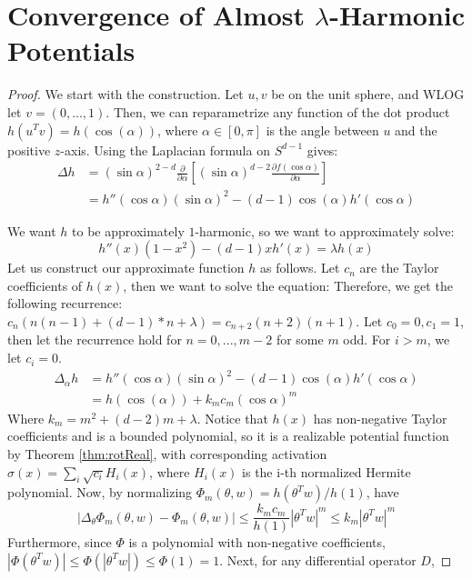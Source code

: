 

\section{Convergence of Almost $\lambda$-Harmonic Potentials}\label{App:EigenFunc}

\almostHarmonic*

\begin{proof}
We start with the construction. Let $u,v$ be on the unit sphere, and WLOG let $v = (0,...,1)$. Then, we can reparametrize any function of the dot product $h(u^Tv) = h(\cos(\alpha))$, where $\alpha \in [0, \pi]$ is the angle between $u$ and the positive $z$-axis.
Using the Laplacian formula on $S^{d-1}$ gives: \cite{Laplacian}
\begin{align*}
\Delta h & = (\sin \alpha)^{2-d} \frac{\partial}{\partial \alpha}\left[ (\sin \alpha)^{d-2} \frac{\partial f(\cos \alpha)}{\partial \alpha}\right] \\
& = h''(\cos\alpha)(\sin \alpha)^{2} - (d-1)\cos(\alpha)h'(\cos\alpha)
\end{align*}


We want $h$ to be approximately $1$-harmonic, so we want to approximately solve:
%
\[h''(x)(1-x^2) - (d-1)xh'(x) =  \lambda h(x) \]
%
Let us construct our approximate function $h$ as follows. Let $c_n$ are the Taylor coefficients of $h(x)$, then we want to solve the equation:
Therefore, we get the following recurrence: $c_n (n(n-1) + (d-1)*n + \lambda) = c_{n+2} (n+2)(n+1)$. Let $c_0 = 0, c_1 = 1$, then let the recurrence hold for $n=0,...,m-2$ for some $m$ odd. For $i > m$, we let $c_i = 0$. 
\begin{align*}
\Delta_\alpha h & = h''(\cos\alpha)(\sin \alpha)^{2} - (d-1)\cos(\alpha)h'(\cos\alpha) \\
&= h(\cos(\alpha)) + k_mc_m(\cos\alpha)^m
\end{align*}
Where $k_m = m^2 + (d-2)m + \lambda$. Notice that $h(x)$ has non-negative
Taylor coefficients and is a bounded polynomial, so it is a
realizable potential function by Theorem \ref{thm:rotReal}, with
corresponding activation $\sigma(x) = \sum_{i} \sqrt{c_i} H_i(x)$, where $H_i(x)$
is the i-th normalized Hermite polynomial. Now, by normalizing
$\Phi_m(\theta, w) = h(\theta^Tw)/h(1)$, have
%
\[|\Delta_\theta \Phi_m(\theta ,w) - \Phi_m(\theta,w) | \leq \frac{k_mc_m}{h(1)} |\theta^Tw|^m \leq k_m|\theta^Tw|^m\]
Furthermore, since $\Phi$ is a polynomial with non-negative coefficients, $|\Phi(\theta^Tw)| \leq \Phi(|\theta^Tw|) \leq \Phi(1) = 1$. Next, for any differential operator $D$, 


\end{proof}
